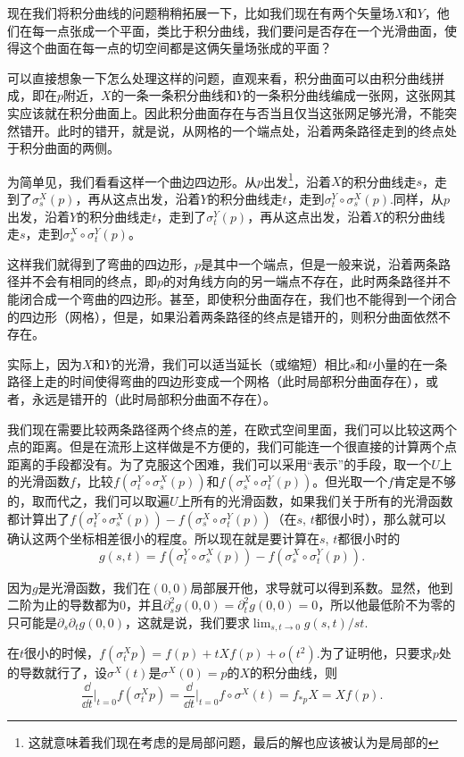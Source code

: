 \para 现在我们将积分曲线的问题稍稍拓展一下，比如我们现在有两个矢量场$X$和$Y$，他们在每一点张成一个平面，类比于积分曲线，我们要问是否存在一个光滑曲面，使得这个曲面在每一点的切空间都是这俩矢量场张成的平面？

可以直接想象一下怎么处理这样的问题，直观来看，积分曲面可以由积分曲线拼成，即在$p$附近，$X$的一条一条积分曲线和$Y$的一条积分曲线编成一张网，这张网其实应该就在积分曲面上。因此积分曲面存在与否当且仅当这张网足够光滑，不能突然错开。此时的错开，就是说，从网格的一个端点处，沿着两条路径走到的终点处于积分曲面的两侧。

为简单见，我们看看这样一个曲边四边形。从$p$出发\footnote{这就意味着我们现在考虑的是局部问题，最后的解也应该被认为是局部的}，沿着$X$的积分曲线走$s$，走到了$\sigma^X_s(p)$，再从这点出发，沿着$Y$的积分曲线走$t$，走到$\sigma^Y_t\circ\sigma^X_s(p)$.同样，从$p$出发，沿着$Y$的积分曲线走$t$，走到了$\sigma^Y_t(p)$，再从这点出发，沿着$X$的积分曲线走$s$，走到$\sigma^X_s\circ\sigma^Y_t(p)$。

这样我们就得到了弯曲的四边形，$p$是其中一个端点，但是一般来说，沿着两条路径并不会有相同的终点，即$p$的对角线方向的另一端点不存在，此时两条路径并不能闭合成一个弯曲的四边形。甚至，即使积分曲面存在，我们也不能得到一个闭合的四边形（网格），但是，如果沿着两条路径的终点是错开的，则积分曲面依然不存在。

实际上，因为$X$和$Y$的光滑，我们可以适当延长（或缩短）相比$s$和$t$小量的在一条路径上走的时间使得弯曲的四边形变成一个网格（此时局部积分曲面存在），或者，永远是错开的（此时局部积分曲面不存在）。

我们现在需要比较两条路径两个终点的差，在欧式空间里面，我们可以比较这两个点的距离。但是在流形上这样做是不方便的，我们可能连一个很直接的计算两个点距离的手段都没有。为了克服这个困难，我们可以采用“表示”的手段，取一个$U$上的光滑函数$f$，比较$f(\sigma^Y_t\circ\sigma^X_s(p))$和$f(\sigma^X_s\circ\sigma^Y_t(p))$。但光取一个$f$肯定是不够的，取而代之，我们可以取遍$U$上所有的光滑函数，如果我们关于所有的光滑函数都计算出了$f(\sigma^Y_t\circ\sigma^X_s(p))-f(\sigma^X_s\circ\sigma^Y_t(p))$（在$s$, $t$都很小时），那么就可以确认这两个坐标相差很小的程度。所以现在就是要计算在$s$, $t$都很小时的
\[
	g(s,t)=f(\sigma^Y_t\circ\sigma^X_s(p))-f(\sigma^X_s\circ\sigma^Y_t(p)).
\]

因为$g$是光滑函数，我们在$(0,0)$局部展开他，求导就可以得到系数。显然，他到二阶为止的导数都为$0$，并且$\partial_s^2g(0,0)=\partial_t^2g(0,0)=0$，所以他最低阶不为零的只可能是$\partial_s\partial_t g(0,0)$，这就是说，我们要求$\lim_{s,t\to 0}g(s,t)/st$.

\para 在$t$很小的时候，$f(\sigma_t^X p)=f(p)+tXf(p)+o(t^2)$.为了证明他，只要求$p$处的导数就行了，设$\sigma^X(t)$是$\sigma^X(0)=p$的$X$的积分曲线，则
\[
	\frac{\dd}{\dd t}\biggr|_{t=0}f(\sigma_t^X p)=\frac{\dd}{\dd t}\biggr|_{t=0}f\circ \sigma^X (t)=f_{* p}X=Xf(p).
\]


